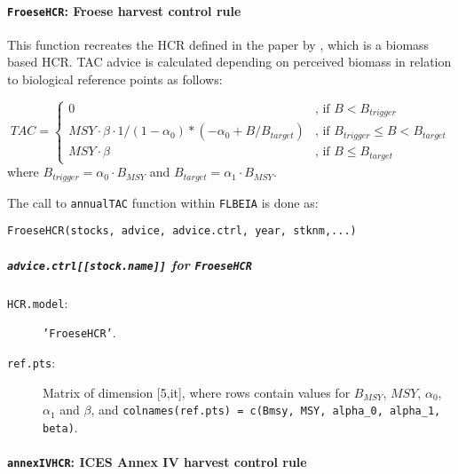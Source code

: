\paragraph{\texttt{FroeseHCR}: Froese harvest control rule} \hspace{0pt} \smallskip

   This function recreates the HCR defined in the paper by \cite{Froese2011}, which is a biomass based HCR.
   TAC advice is calculated depending on perceived biomass in relation to biological reference points as follows:

  \begin{equation}
  	TAC = 
  	\begin{cases}
				0                & \text{, if } B < B_{trigger}\\
				MSY \cdot \beta \cdot 1/(1-\alpha_0)*(-\alpha_0 + B / B_{target}) & \text{, if } B_{trigger} \leq B < B_{target}\\
				MSY \cdot \beta  & \text{, if } B \leq B_{target}
  	\end{cases}
  \end{equation}
  \noindent where $B_{trigger} = \alpha_0 \cdot B_{MSY}$ and $B_{target} = \alpha_1 \cdot B_{MSY}$.

   The call to \texttt{annualTAC} function within \texttt{FLBEIA} is done as:
	
	\begin{center}
		\texttt{FroeseHCR(stocks, advice, advice.ctrl, year, stknm,...)} 
	\end{center}
	
	\subparagraph{\texttt{advice.ctrl[[stock.name]]} for \texttt{FroeseHCR}}

	  \begin{description}
	    \item[\texttt{HCR.model}:] \texttt{'FroeseHCR'}.
		  \item[\texttt{ref.pts}:] Matrix of dimension [5,it], 
		    where rows contain values for $B_{MSY}$, $MSY$, $\alpha_0$, $\alpha_1$ and $\beta$, 
		    and \texttt{colnames(ref.pts) = c(Bmsy, MSY, alpha\_0, alpha\_1, beta)}.
	\end{description}


\paragraph{\texttt{annexIVHCR}: ICES Annex IV harvest control rule} \hspace{0pt} \smallskip

